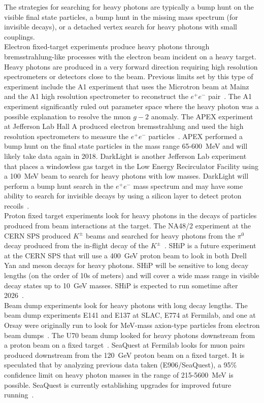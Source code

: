 The strategies for searching for heavy photons are typically a bump hunt on the visible final state particles, a bump hunt in the missing mass spectrum (for invisible decays), or a detached vertex search for heavy photons with small couplings. \\
\indent Electron fixed-target experiments produce heavy photons through bremsstrahlung-like processes with the electron beam incident on a heavy target. Heavy photons are produced in a very forward direction requiring high resolution spectrometers or detectors close to the beam. Previous limits set by this type of experiment include the A1 experiment that uses the Microtron beam at Mainz and the A1 high resolution spectrometer to reconstruct the $e^+e^-$ pair~\cite{beranek_theoretical_2013}. The A1 experiment significantly ruled out parameter space where the heavy photon was a possible explanation to resolve the muon $g-2$ anomaly. The APEX experiment at Jefferson Lab Hall A produced electron bremsstrahlung and used the high resolution spectrometers to measure the $e^+e^-$ particles~\cite{abrahamyan_search_2011}. APEX performed a bump hunt on the final state particles in the mass range 65-600~MeV and will likely take data again in 2018. DarkLight is another Jefferson Lab experiment that places a windowless gas target in the Low Energy Recirculator Facility using a 100~MeV beam to search for heavy photons with low masses. DarkLight will perform a bump hunt search in the $e^+e^-$ mass spectrum and may have some ability to search for invisible decays by using a silicon layer to detect proton recoils~\cite{balewski_darklight_2014}.\\
\indent Proton fixed target experiments look for heavy photons in the decays of particles produced from beam interactions at the target. The NA48/2 experiment at the CERN SPS produced $K^{\pm}$ beams and searched for heavy photons from the $\pi^0$ decay produced from the in-flight decay of the $K^{\pm}$~\cite{Batley_2015lha}. SHiP is a future experiment at the CERN SPS that will use a 400~GeV proton beam to look in both Drell Yan and meson decays for heavy photons. SHiP will be sensitive to long decay lengths (on the order of 10s of meters) and will cover a wide mass range in visible decay states up to 10~GeV masses. SHiP is expected to run sometime after 2026~\cite{ship_collaboration_facility_2015}.\\
\indent Beam dump experiments look for heavy photons with long decay lengths. The beam dump experiments E141 and E137 at SLAC, E774 at Fermilab, and one at Orsay were originally run to look for MeV-mass axion-type particles from electron beam dumps~\cite{alexander_dark_2016}. The U70 beam dump looked for heavy photons downstream from a proton beam on a fixed target~\cite{Blumlein:2013cua}. SeaQuest at Fermilab looks for muon pairs produced downstream from the 120~GeV proton beam on a fixed target. It is speculated that by analyzing previous data taken (E906/SeaQuest), a 95$\%$ confidence limit on heavy photon masses in the range of 215-5600~MeV is possible. SeaQuest is currently establishing upgrades for improved future running~\cite{gardner_new_2016}.\\
